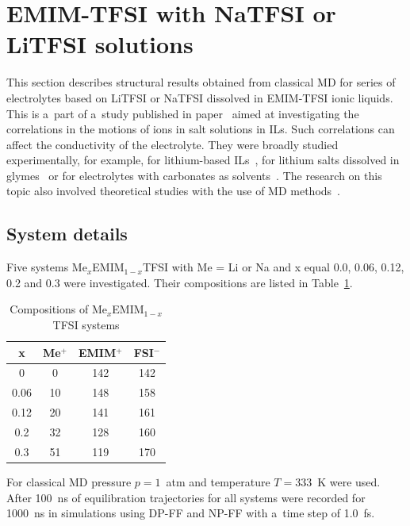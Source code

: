 \section{EMIM-TFSI with NaTFSI or LiTFSI solutions}

This section describes structural results obtained from classical MD for series of electrolytes based on LiTFSI or NaTFSI dissolved in EMIM-TFSI ionic liquids. This is a~part of a~study published in paper~\cite{li-na} aimed at investigating the correlations in the motions of ions in salt solutions in ILs. Such correlations can affect the conductivity of the electrolyte. They were broadly studied experimentally, for example, for lithium-based ILs~\cite{li-na-exp-1,li-na-exp-2,li-na-exp-3}, for lithium salts dissolved in glymes~\cite{li-na-exp-4,li-na-exp-5} or for electrolytes with carbonates as solvents~\cite{li-na-exp-6}. The research on this topic also involved theoretical studies with the use of MD methods~\cite{li-na-continuation,li-na-md-1,li-na-md-2,li-na-md-3}.

\subsection{System details}
\label{subsection:li-na-system-details}

Five systems Me$_x$EMIM$_{1-x}$TFSI with Me = Li or Na and x equal 0.0, 0.06, 0.12, 0.2 and 0.3 were investigated. Their compositions are listed in Table~\ref{tab:li-na-compositions}.

\begin{table}[ht]
    \centering
    \caption{Compositions of Me$_{x}$EMIM$_{1-x}$TFSI systems}
    \label{tab:li-na-compositions}
    \begin{tabular}{cccc}
      \toprule
      x & Me$^{+}$ & EMIM$^{+}$ & FSI$^{-}$ \\
      \midrule
      0 & 0 & 142 & 142 \\
      0.06 & 10 & 148 & 158 \\
      0.12 & 20 & 141 & 161 \\
      0.2 & 32 & 128 & 160 \\
      0.3 & 51 & 119 & 170 \\
      \bottomrule
    \end{tabular}    
\end{table}

For classical MD pressure $p = 1$~atm and temperature $T = 333$~K were used. After 100~ns of equilibration trajectories for all systems were recorded for 1000~ns in simulations using DP-FF and NP-FF with a~time step of 1.0~fs.

